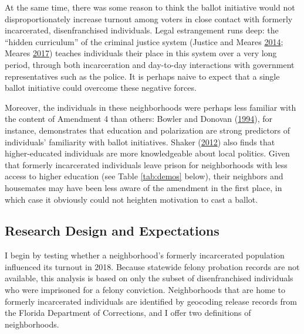 \documentclass[
  12pt,
]{article}
\begin{document}
At the same time, there was some reason to think the ballot initiative would not disproportionately increase turnout among voters in close contact with formerly incarcerated, disenfranchised individuals. Legal estrangement runs deep: the ``hidden curriculum'' of the criminal justice system (Justice and Meares \protect\hyperlink{ref-Justice2014}{2014}; Meares \protect\hyperlink{ref-Meares2017}{2017}) teaches individuals their place in this system over a very long period, through both incarceration and day-to-day interactions with government representatives such as the police. It is perhaps naive to expect that a single ballot initiative could overcome these negative forces.

Moreover, the individuals in these neighborhoods were perhaps less familiar with the content of Amendment 4 than others: Bowler and Donovan (\protect\hyperlink{ref-Bowler1994}{1994}), for instance, demonstrates that education and polarization are strong predictors of individuals' familiarity with ballot initiatives. Shaker (\protect\hyperlink{ref-Shaker2012}{2012}) also finds that higher-educated individuals are more knowledgeable about local politics. Given that formerly incarcerated individuals leave prison for neighborhoods with less access to higher education (see Table \ref{tab:demos} below), their neighbors and housemates may have been less aware of the amendment in the first place, in which case it obviously could not heighten motivation to cast a ballot.

\hypertarget{research-design-and-expectations}{%
\subsection*{Research Design and Expectations}\label{research-design-and-expectations}}

I begin by testing whether a neighborhood's formerly incarcerated population influenced its turnout in 2018. Because statewide felony probation records are not available, this analysis is based on only the subset of disenfranchised individuals who were imprisoned for a felony conviction. Neighborhoods that are home to formerly incarcerated individuals are identified by geocoding release records from the Florida Department of Corrections, and I offer two definitions of neighborhoods.
\end{document}
